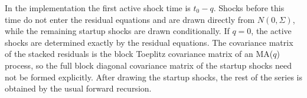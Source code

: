 \documentclass[a4paper,12pt]{extarticle} %
\begin{document}
In the implementation the first active shock time is $t_0-q$. Shocks before
this time do not enter the residual equations and are drawn directly from
$N(0,\Sigma)$, while the remaining startup shocks are drawn conditionally. If
$q=0$, the active shocks are determined exactly by the residual equations. The
covariance matrix of the stacked residuals is the block Toeplitz covariance
matrix of an MA($q$) process, so the full block diagonal covariance matrix of
the startup shocks need not be formed explicitly. After drawing the startup
shocks, the rest of the series is obtained by the usual forward recursion.

\end{document}
